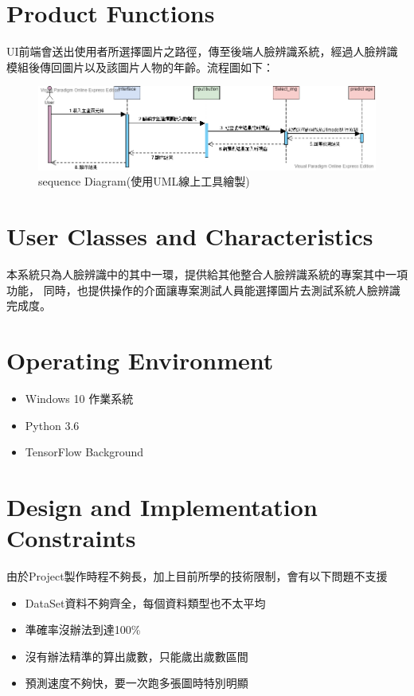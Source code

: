 \documentclass{scrreprt}
\begin{document}
\begin{CJK}{UTF8}{bkai}
\section{Product Functions}
UI前端會送出使用者所選擇圖片之路徑，傳至後端人臉辨識系統，經過人臉辨識模組後傳回圖片以及該圖片人物的年齡。流程圖如下：\\
    \begin{figure}[htb]
        \begin{center}
            \includegraphics[scale=0.5]{image/sequenceDiagram.png}%
        \end{center}
        \caption{sequence Diagram(使用UML線上工具繪製)}
        \label{fig:2}
    \end{figure}

\section{User Classes and Characteristics}
本系統只為人臉辨識中的其中一環，提供給其他整合人臉辨識系統的專案其中一項功能，
同時，也提供操作的介面讓專案測試人員能選擇圖片去測試系統人臉辨識完成度。\\

\section{Operating Environment}
\begin{itemize}
    \item Windows 10 作業系統
    \item Python 3.6
    \item TensorFlow Background
\end{itemize}

\section{Design and Implementation Constraints}
由於Project製作時程不夠長，加上目前所學的技術限制，會有以下問題不支援
\begin{itemize}
    \item DataSet資料不夠齊全，每個資料類型也不太平均
    \item 準確率沒辦法到達100\%
    \item 沒有辦法精準的算出歲數，只能歲出歲數區間
    \item 預測速度不夠快，要一次跑多張圖時特別明顯
\end{itemize}


\end{CJK}
\end{document}
